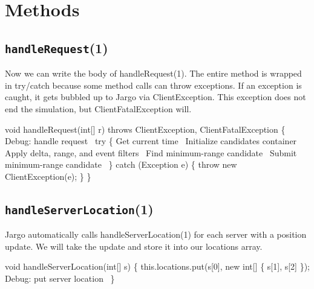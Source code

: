 \section{Methods}
\label{client-nearest: methods}

\subsection{\texttt{handleRequest}(1)}

Now we can write the body of {\Tt{}handleRequest\nwendquote}(1).  The entire method is
wrapped in try/catch because some method calls can throw exceptions. If an
exception is caught, it gets bubbled up to Jargo via {\Tt{}ClientException\nwendquote}. This
exception does not end the simulation, but {\Tt{}ClientFatalException\nwendquote} will.

\nwenddocs{}\endmoddef\nwstartdeflinemarkup{}\nwenddeflinemarkup
void handleRequest(int[] r) throws ClientException, ClientFatalException \{
  \LA{}Debug: handle request~{\nwtagstyle{}}\RA{}
  try \{
    \LA{}Get current time~{\nwtagstyle{}}\RA{}
    \LA{}Initialize candidates container~{\nwtagstyle{}}\RA{}
    \LA{}Apply delta, range, and event filters~{\nwtagstyle{}}\RA{}
    \LA{}Find minimum-range candidate~{\nwtagstyle{}}\RA{}
    \LA{}Submit minimum-range candidate~{\nwtagstyle{}}\RA{}
  \} catch (Exception e) \{
    throw new ClientException(e);
  \}
\}
\nwendcode{}\nwdocspar

\subsection{\texttt{handleServerLocation}(1)}

Jargo automatically calls {\Tt{}handleServerLocation\nwendquote}(1) for each server with
a position update. We will take the update and store it into our {\Tt{}locations\nwendquote}
array.

\nwenddocs{}\endmoddef\nwstartdeflinemarkup{}\nwenddeflinemarkup
void handleServerLocation(int[] s) \{
  this.locations.put(s[0], new int[] \{ s[1], s[2] \});
  \LA{}Debug: put server location~{\nwtagstyle{}}\RA{}
\}
\nwendcode{}\nwdocspar

